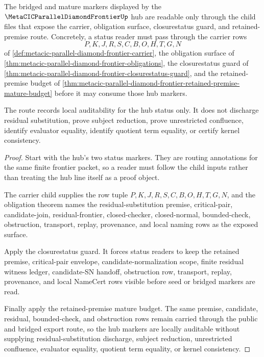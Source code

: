 \begin{theorem}
\label{thm:metacic-parallel-diamond-frontier-bridge-hub-child-route}
The bridged and mature markers displayed by the $\MetaCICParallelDiamondFrontierUp$ hub are readable only through the child files that expose the carrier, obligation surface, closurestatus guard, and retained-premise route. Concretely, a status reader must pass through the carrier rows
$$
P,K,J,R,S,C,B,O,H,T,G,N
$$
of \autoref{def:metacic-parallel-diamond-frontier-carrier}, the obligation surface of \autoref{thm:metacic-parallel-diamond-frontier-obligations}, the closurestatus guard of \autoref{thm:metacic-parallel-diamond-frontier-closurestatus-guard}, and the retained-premise budget of \autoref{thm:metacic-parallel-diamond-frontier-retained-premise-mature-budget} before it may consume those hub markers.

The route records local auditability for the hub status only. It does not discharge residual substitution, prove subject reduction, prove unrestricted confluence, identify evaluator equality, identify quotient term equality, or certify kernel consistency.
\end{theorem}
\begin{proof}
Start with the hub's two status markers. They are routing annotations for the same finite frontier packet, so a reader must follow the child inputs rather than treating the hub line itself as a proof object.

The carrier child supplies the row tuple $P,K,J,R,S,C,B,O,H,T,G,N$, and the obligation theorem names the residual-substitution premise, critical-pair, candidate-join, residual-frontier, closed-checker, closed-normal, bounded-check, obstruction, transport, replay, provenance, and local naming rows as the exposed surface.

Apply the closurestatus guard. It forces status readers to keep the retained premise, critical-pair envelope, candidate-normalization scope, finite residual witness ledger, candidate-SN handoff, obstruction row, transport, replay, provenance, and local NameCert rows visible before seed or bridged markers are read.

Finally apply the retained-premise mature budget. The same premise, candidate, residual, bounded-check, and obstruction rows remain carried through the public and bridged export route, so the hub markers are locally auditable without supplying residual-substitution discharge, subject reduction, unrestricted confluence, evaluator equality, quotient term equality, or kernel consistency.
\end{proof}
